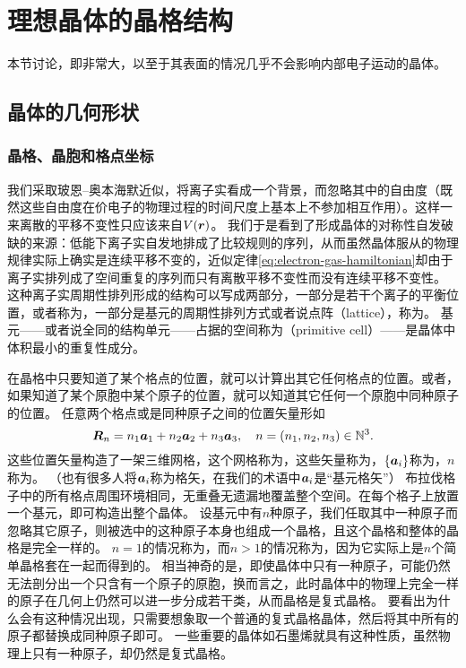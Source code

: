 \section{理想晶体的晶格结构}\label{sec:lattice-structure}

本节讨论，即非常大，以至于其表面的情况几乎不会影响内部电子运动的晶体。

\subsection{晶体的几何形状}

\subsubsection{晶格、晶胞和格点坐标}

我们采取玻恩–奥本海默近似，将离子实看成一个背景，而忽略其中的自由度（既然这些自由度在价电子的物理过程的时间尺度上基本上不参加相互作用）。这样一来离散的平移不变性只应该来自$V(\vb*{r})$。
我们于是看到了形成晶体的对称性自发破缺的来源：低能下离子实自发地排成了比较规则的序列，从而虽然晶体服从的物理规律实际上确实是连续平移不变的，近似定律\eqref{eq:electron-gas-hamiltonian}却由于离子实排列成了空间重复的序列而只有离散平移不变性而没有连续平移不变性。
这种离子实周期性排列形成的结构可以写成两部分，一部分是若干个离子的平衡位置，或者称为，一部分是基元的周期性排列方式或者说点阵（lattice），称为。
基元——或者说全同的结构单元——占据的空间称为（primitive cell）——是晶体中体积最小的重复性成分。

在晶格中只要知道了某个格点的位置，就可以计算出其它任何格点的位置。或者，如果知道了某个原胞中某个原子的位置，就可以知道其它任何一个原胞中同种原子的位置。
任意两个格点或是同种原子之间的位置矢量形如
\begin{equation}
    \vb*{R}_n = n_1 \vb*{a}_1 + n_2 \vb*{a}_2 + n_3 \vb*{a}_3, \quad n = (n_1, n_2, n_3) \in \mathbb{N}^3.
\end{equation}
这些位置矢量构造了一架三维网格，这个网格称为，这些矢量称为，$\{\vb*{a}_i\}$称为，$n$称为。
（也有很多人将$\vb*{a}_i$称为格矢，在我们的术语中$\vb*{a}_i$是“基元格矢”）
布拉伐格子中的所有格点周围环境相同，无重叠无遗漏地覆盖整个空间。在每个格子上放置一个基元，即可构造出整个晶体。
设基元中有$n$种原子，我们任取其中一种原子而忽略其它原子，则被选中的这种原子本身也组成一个晶格，且这个晶格和整体的晶格是完全一样的。
$n=1$的情况称为，而$n>1$的情况称为，因为它实际上是$n$个简单晶格套在一起而得到的。
相当神奇的是，即使晶体中只有一种原子，可能仍然无法剖分出一个只含有一个原子的原胞，换而言之，此时晶体中的物理上完全一样的原子在几何上仍然可以进一步分成若干类，从而晶格是复式晶格。
要看出为什么会有这种情况出现，只需要想象取一个普通的复式晶格晶体，然后将其中所有的原子都替换成同种原子即可。
一些重要的晶体如石墨烯就具有这种性质，虽然物理上只有一种原子，却仍然是复式晶格。

